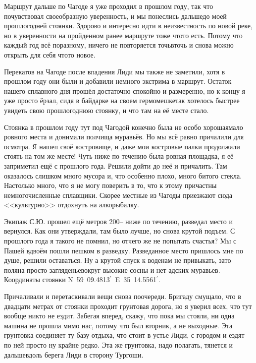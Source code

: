 Маршрут дальше по Чагоде я уже проходил в прошлом году, так что почувствовал своеобразную уверенность, и мы понеслись дальше\mdash  до моей прошлогодней стоянки. Здорово и интересно идти в неизвестность по новой реке, но в уверенности на пройденном ранее маршруте тоже что\sdash то есть. Потому что каждый год всё по\sdash разному, ничего не повторяется точь\sdash в\sdash точь и снова можно открыть для себя что\sdash то новое. 
 
Перекатов на Чагоде после впадения Лиди мы также не заметили, хотя в прошлом году они были и добавили немного экстрима в маршрут. Остаток нашего сплавного дня прошёл достаточно спокойно и размеренно, но к концу я уже просто ёрзал, сидя в байдарке на своем гермомешке\mdash  так хотелось быстрее увидеть свою прошлогоднюю стоянку, и что там на её месте стало. 

Стоянка в прошлом году тут под Чагодой конечно была не особо хорошая\mdash  мало ровного места и донимали полчища муравьёв. Но мы всё равно причалили для осмотра. Я нашел своё костровище, и даже мои костровые палки продолжали стоять на том же месте! Чуть ниже по течению была ровная площадка, я её заприметил ещё с прошлого года. Решили дойти до неё и причалить. Там оказалось слишком много мусора и, что особенно плохо, много битого стекла. Настолько много, что я не могу поверить в то, что к этому причастны немногочисленные сплавщики. Скорее местные из Чагоды приезжают сюда <<культурно>> отдохнуть на алкорыбалку. 

Экипаж С.Ю. прошел ещё метров 200\thinspace\nobreakdash-- ниже по течению, разведал место и вернулся. Как они утверждали, там было лучше, но снова крутой подъем. С прошлого года я такого не помнил, но отчего же не попытать счастья? Мы с Пашей вдвоём пошли пешком в разведку. Разведанное место пришлось мне по душе, решили оставаться. Ну а крутой спуск к воде\mdash  нам не привыкать, зато поляна просто загляденье\mdash  вокруг высокие сосны и нет адских муравьев. Координаты стоянки N~59\degree~09.4813$^\prime$~E~35\degrees~14.5561$^\prime$.

Причаливали и перетаскивали вещи снова по\sdash очереди. Бригаду смущало, что в двадцати метрах от стоянки проходит грунтовая дорога, но я уверил всех, что тут вообще никто не ездит. Забегая вперед, скажу, что пока мы стояли, ни одна машина не прошла мимо нас, потому что был вторник, а не выходные. Эта грунтовка соединяет ту базу отдыха, что стоит в устье Лиди, с городом и ездят по ней просто ну крайне редко. Эта же грунтовка, надо полагать, тянется и дальше\mdash вдоль берега Лиди в сторону Тургоши.

